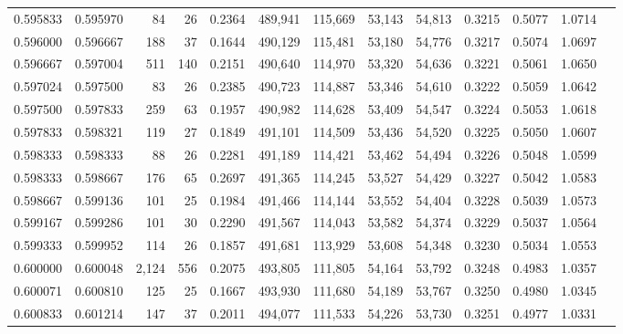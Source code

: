\begin{tabular}{rrrrrrrrrrrrr}
0.595833 & 0.595970 &    84 &  26 &                                     0.2364 & 489,941 & 115,669 &  53,143 &  54,813 & 0.3215 & 0.5077 & 1.0714 \\
0.596000 & 0.596667 &   188 &  37 &                                     0.1644 & 490,129 & 115,481 &  53,180 &  54,776 & 0.3217 & 0.5074 & 1.0697 \\
0.596667 & 0.597004 &   511 & 140 &                                     0.2151 & 490,640 & 114,970 &  53,320 &  54,636 & 0.3221 & 0.5061 & 1.0650 \\
0.597024 & 0.597500 &    83 &  26 &                                     0.2385 & 490,723 & 114,887 &  53,346 &  54,610 & 0.3222 & 0.5059 & 1.0642 \\
0.597500 & 0.597833 &   259 &  63 &                                     0.1957 & 490,982 & 114,628 &  53,409 &  54,547 & 0.3224 & 0.5053 & 1.0618 \\
0.597833 & 0.598321 &   119 &  27 &                                     0.1849 & 491,101 & 114,509 &  53,436 &  54,520 & 0.3225 & 0.5050 & 1.0607 \\
0.598333 & 0.598333 &    88 &  26 &                                     0.2281 & 491,189 & 114,421 &  53,462 &  54,494 & 0.3226 & 0.5048 & 1.0599 \\
0.598333 & 0.598667 &   176 &  65 &                                     0.2697 & 491,365 & 114,245 &  53,527 &  54,429 & 0.3227 & 0.5042 & 1.0583 \\
0.598667 & 0.599136 &   101 &  25 &                                     0.1984 & 491,466 & 114,144 &  53,552 &  54,404 & 0.3228 & 0.5039 & 1.0573 \\
0.599167 & 0.599286 &   101 &  30 &                                     0.2290 & 491,567 & 114,043 &  53,582 &  54,374 & 0.3229 & 0.5037 & 1.0564 \\
0.599333 & 0.599952 &   114 &  26 &                                     0.1857 & 491,681 & 113,929 &  53,608 &  54,348 & 0.3230 & 0.5034 & 1.0553 \\
0.600000 & 0.600048 & 2,124 & 556 &                                     0.2075 & 493,805 & 111,805 &  54,164 &  53,792 & 0.3248 & 0.4983 & 1.0357 \\
0.600071 & 0.600810 &   125 &  25 &                                     0.1667 & 493,930 & 111,680 &  54,189 &  53,767 & 0.3250 & 0.4980 & 1.0345 \\
0.600833 & 0.601214 &   147 &  37 &                                     0.2011 & 494,077 & 111,533 &  54,226 &  53,730 & 0.3251 & 0.4977 & 1.0331 \\

\end{tabular}
